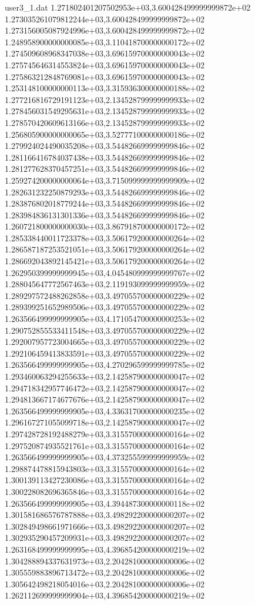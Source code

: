 \begin{filecontents}{user3_1.dat}
1.271802401207502953e+03,3.600428499999999872e+02
1.273035261079812244e+03,3.600428499999999872e+02
1.273156005087924996e+03,3.600428499999999872e+02
1.248958900000000085e+03,3.110418700000000172e+02
1.274509608968347038e+03,3.696159700000000043e+02
1.275745646314553824e+03,3.696159700000000043e+02
1.275863212848769081e+03,3.696159700000000043e+02
1.253148100000000113e+03,3.315936300000000188e+02
1.277216816729191123e+03,2.134528799999999933e+02
1.278456031549295631e+03,2.134528799999999933e+02
1.278570420609613166e+03,2.134528799999999933e+02
1.256805900000000065e+03,3.527771000000000186e+02
1.279924024490035208e+03,3.544826699999999846e+02
1.281166416784037438e+03,3.544826699999999846e+02
1.281277628370457251e+03,3.544826699999999846e+02
1.259274200000000064e+03,3.715099999999999909e+02
1.282631232250879293e+03,3.544826699999999846e+02
1.283876802018779244e+03,3.544826699999999846e+02
1.283984836131301336e+03,3.544826699999999846e+02
1.260721800000000030e+03,3.867918700000000172e+02
1.285338440011723378e+03,3.506179200000000264e+02
1.286587187253521051e+03,3.506179200000000264e+02
1.286692043892145421e+03,3.506179200000000264e+02
1.262950399999999945e+03,4.045480999999999767e+02
1.288045647772567463e+03,2.119193099999999959e+02
1.289297572488262858e+03,3.497055700000000229e+02
1.289399251652989506e+03,3.497055700000000229e+02
1.263566499999999905e+03,4.171054700000000253e+02
1.290752855533411548e+03,3.497055700000000229e+02
1.292007957723004665e+03,3.497055700000000229e+02
1.292106459413833591e+03,3.497055700000000229e+02
1.263566499999999905e+03,4.270296599999999785e+02
1.293460063294255633e+03,2.142587900000000047e+02
1.294718342957746472e+03,2.142587900000000047e+02
1.294813667174677676e+03,2.142587900000000047e+02
1.263566499999999905e+03,4.336317000000000235e+02
1.296167271055099718e+03,2.142587900000000047e+02
1.297428728192488279e+03,3.315570000000000164e+02
1.297520874935521761e+03,3.315570000000000164e+02
1.263566499999999905e+03,4.373255599999999959e+02
1.298874478815943803e+03,3.315570000000000164e+02
1.300139113427230086e+03,3.315570000000000164e+02
1.300228082696365846e+03,3.315570000000000164e+02
1.263566499999999905e+03,4.394487300000000118e+02
1.301581686576787888e+03,3.498292200000000207e+02
1.302849498661971666e+03,3.498292200000000207e+02
1.302935290457209931e+03,3.498292200000000207e+02
1.263168499999999995e+03,4.396854200000000219e+02
1.304288894337631973e+03,2.204281000000000006e+02
1.305559883896713472e+03,2.204281000000000006e+02
1.305642498218054016e+03,2.204281000000000006e+02
1.262112699999999904e+03,4.396854200000000219e+02

\end{filecontents}
